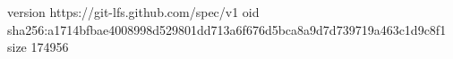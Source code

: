 version https://git-lfs.github.com/spec/v1
oid sha256:a1714bfbae4008998d529801dd713a6f676d5bca8a9d7d739719a463c1d9c8f1
size 174956
